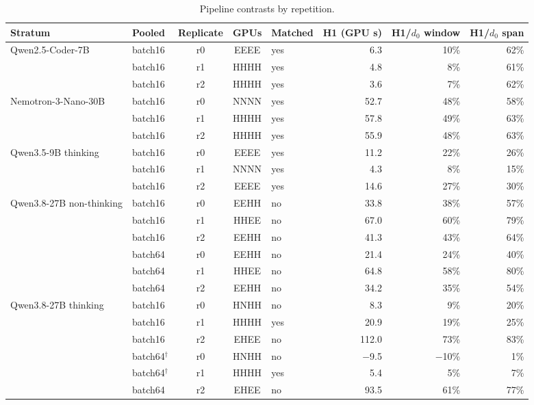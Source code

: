 
\begin{table}[t]
\caption{Pipeline contrasts by repetition.}
\label{tab:replicates}
\centering\small
\begin{tabular}{llcclrrr}
\toprule
Stratum & Pooled & Replicate & GPUs & Matched & H1 (GPU s) & H1/$d_0$ window & H1/$d_0$ span \\
\midrule
Qwen2.5-Coder-7B & batch16 & r0 & EEEE & yes & 6.3 & 10\% & 62\% \\
 & batch16 & r1 & HHHH & yes & 4.8 & 8\% & 61\% \\
 & batch16 & r2 & HHHH & yes & 3.6 & 7\% & 62\% \\
\addlinespace
Nemotron-3-Nano-30B & batch16 & r0 & NNNN & yes & 52.7 & 48\% & 58\% \\
 & batch16 & r1 & HHHH & yes & 57.8 & 49\% & 63\% \\
 & batch16 & r2 & HHHH & yes & 55.9 & 48\% & 63\% \\
\addlinespace
Qwen3.5-9B thinking & batch16 & r0 & EEEE & yes & 11.2 & 22\% & 26\% \\
 & batch16 & r1 & NNNN & yes & 4.3 & 8\% & 15\% \\
 & batch16 & r2 & EEEE & yes & 14.6 & 27\% & 30\% \\
\addlinespace
Qwen3.8-27B non-thinking & batch16 & r0 & EEHH & no & 33.8 & 38\% & 57\% \\
 & batch16 & r1 & HHEE & no & 67.0 & 60\% & 79\% \\
 & batch16 & r2 & EEHH & no & 41.3 & 43\% & 64\% \\
 & batch64 & r0 & EEHH & no & 21.4 & 24\% & 40\% \\
 & batch64 & r1 & HHEE & no & 64.8 & 58\% & 80\% \\
 & batch64 & r2 & EEHH & no & 34.2 & 35\% & 54\% \\
\addlinespace
Qwen3.8-27B thinking & batch16 & r0 & HNHH & no & 8.3 & 9\% & 20\% \\
 & batch16 & r1 & HHHH & yes & 20.9 & 19\% & 25\% \\
 & batch16 & r2 & EHEE & no & 112.0 & 73\% & 83\% \\
 & batch64$^\dagger$ & r0 & HNHH & no & $-$9.5 & $-$10\% & 1\% \\
 & batch64$^\dagger$ & r1 & HHHH & yes & 5.4 & 5\% & 7\% \\
 & batch64 & r2 & EHEE & no & 93.5 & 61\% & 77\% \\
\bottomrule
\end{tabular}
\end{table}
